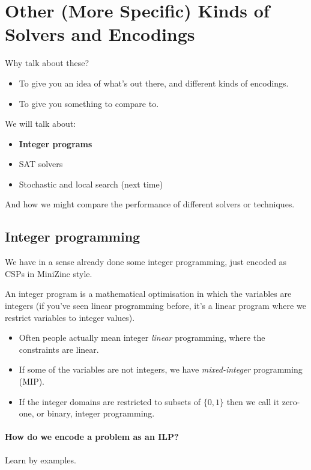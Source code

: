 \documentclass[11pt]{article}
\begin{document}
\section{Other (More Specific) Kinds of Solvers and Encodings}

Why talk about these?
\begin{itemize}
    \item To give you an idea of what's out there, and different kinds of encodings.
    \item To give you something to compare to.
\end{itemize}

We will talk about:
\begin{itemize}
    \item \textbf{Integer programs}
    \item SAT solvers
    \item Stochastic and local search (next time)
\end{itemize}

And how we might compare the performance of different solvers or techniques.

\subsection{Integer programming}

We have in a sense already done some integer programming, just encoded as CSPs in MiniZinc style.

An integer program is a mathematical optimisation in which the variables are integers (if you've seen linear programming before, it's a linear program where we restrict variables to integer values).
\begin{itemize}
    \item Often people actually mean integer \emph{linear} programming, where the constraints are linear.
    \item If some of the variables are not integers, we have \emph{mixed-integer} programming (MIP).
    \item If the integer domains are restricted to subsets of $\{0, 1\}$ then we call it zero-one, or binary, integer programming.
\end{itemize}

\paragraph{How do we encode a problem as an ILP?} Learn by examples.
\end{document}
